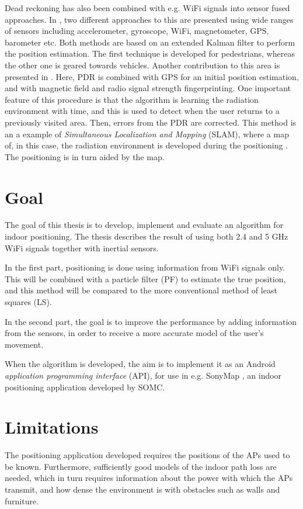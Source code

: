\documentclass{LTHthesis}
\begin{document}
Dead reckoning has also been combined with e.g. WiFi signals into sensor fused approaches. In \cite{inteli_nav,navio}, two different approaches to this are presented using wide ranges of sensors including accelerometer, gyroscope, WiFi, magnetometer, GPS, barometer etc. Both methods are based on an extended Kalman filter to perform the position estimation. The first technique is developed for pedestrians, whereas the other one is geared towards vehicles. Another contribution to this area is presented in \cite{closer_to_everywhere}. Here, PDR is combined with GPS for an initial position estimation, and with magnetic field and radio signal strength fingerprinting. One important feature of this procedure is that the algorithm is learning the radiation environment with time, and this is used to detect when the user returns to a previously visited area. Then, errors from the PDR are corrected. This method is an a example of \emph{Simultaneous Localization and Mapping} (SLAM), where a map of, in this case, the radiation environment is developed during the positioning \cite{gson12}. The positioning is in turn aided by the map.

\section{Goal}

The goal of this thesis is to develop, implement and evaluate an algorithm for indoor positioning. The thesis describes the result of using both 2.4 and 5 GHz WiFi signals together with inertial sensors.

In the first part, positioning is done using information from WiFi signals only. This will be combined with a particle filter (PF) to estimate the true position, and this method will be compared to the more conventional method of least squares (LS).

In the second part, the goal is to improve the performance by adding information from the sensors, in order to receive a more accurate model of the user's movement.

When the algorithm is developed, the aim is to implement it as an Android \emph{application programming interface} (API), for use in e.g. SonyMap \cite{sonymap}, an indoor positioning application developed by SOMC.

\section{Limitations}
%
The positioning application developed requires the positions of the APs used to be known. Furthermore, sufficiently good models of the indoor path loss are needed, which in turn requires information about the power with which the APs transmit, and how dense the environment is with obstacles such as walls and furniture. 
\end{document}
